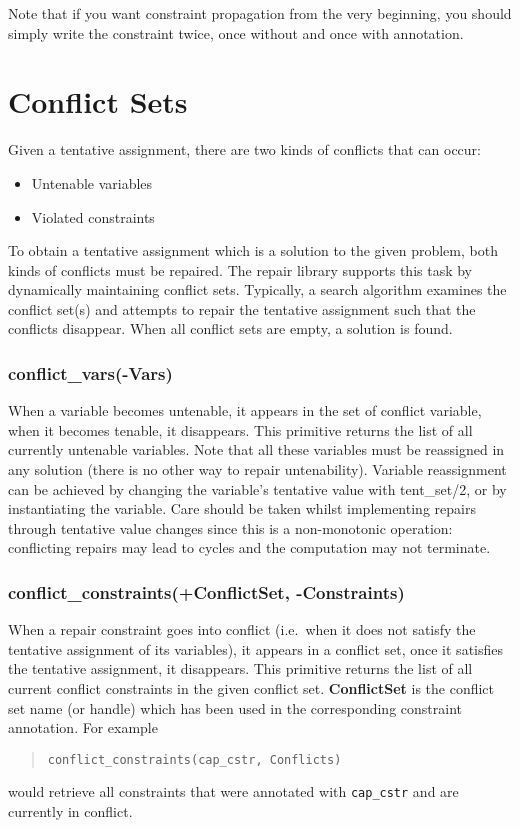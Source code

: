 Note that if you want constraint propagation from the very beginning,
you should simply write the constraint twice, once without and once
with annotation.


\section{Conflict Sets}

Given a tentative assignment, there are two kinds of conflicts that
can occur:
\begin{itemize}
\item   Untenable variables
\item   Violated constraints
\end{itemize}
To obtain a tentative assignment which is a solution to the given problem,
both kinds of conflicts must be repaired.
The repair library supports this task by dynamically maintaining
conflict sets.
Typically, a search algorithm examines the conflict set(s) and attempts
to repair the tentative assignment such that the conflicts disappear.
When all conflict sets are empty, a solution is found.

\subsubsection{conflict_vars(-Vars)}
When a variable becomes untenable, it appears in the set of conflict
variable, when it becomes tenable, it disappears.
This primitive returns the list of all currently untenable variables.
Note that all these variables must be reassigned in any solution
(there is no other way to repair untenability).
Variable reassignment can be achieved
by changing the variable's tentative value with tent_set/2,
or by instantiating the variable.
Care should be taken whilst implementing repairs through tentative
value changes since this is a non-monotonic operation: conflicting repairs
may lead to cycles and the computation may not terminate.  


\subsubsection{conflict_constraints(+ConflictSet, -Constraints)}
When a repair constraint goes into conflict (i.e.\ when it does not satisfy
the tentative assignment of its variables), it appears in a conflict set,
once it satisfies the tentative assignment, it disappears.
This primitive returns the list of all current conflict constraints
in the given conflict set.
{\bf ConflictSet} is the conflict set name (or handle) which has
been used in the corresponding constraint annotation.  For example
\begin{quote}\begin{verbatim}
conflict_constraints(cap_cstr, Conflicts)
\end{verbatim}\end{quote}
would retrieve all constraints that were annotated with \verb+cap_cstr+
and are currently in conflict.

